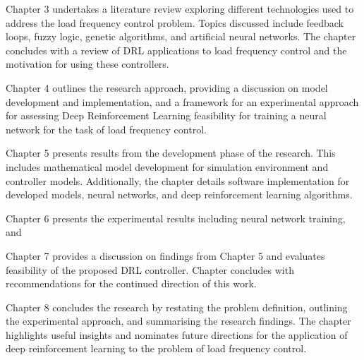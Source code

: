 Chapter 3 undertakes a literature review exploring different technologies used to address the load frequency control problem. Topics discussed include feedback loops, fuzzy logic, genetic algorithms, and artificial neural networks. The chapter concludes with a review of DRL applications to load frequency control and the motivation for using these controllers.

Chapter 4 outlines the research approach, providing a discussion on model development and implementation, and a framework for an experimental approach for assessing Deep Reinforcement Learning feasibility for training a neural network for the task of load frequency control.

Chapter 5 presents results from the development phase of the research. This includes mathematical model development for simulation environment and controller models. Additionally, the chapter details software implementation for developed models, neural networks, and deep reinforcement learning algorithms.

Chapter 6 presents the experimental results including neural network training, and 

Chapter 7 provides a discussion on findings from Chapter 5 and evaluates feasibility of the proposed DRL controller. Chapter concludes with recommendations for the continued direction of this work.

Chapter 8 concludes the research by restating the problem definition, outlining the experimental approach, and summarising the research findings. The chapter highlights useful insights and nominates future directions for the application of deep reinforcement learning to the problem of load frequency control.